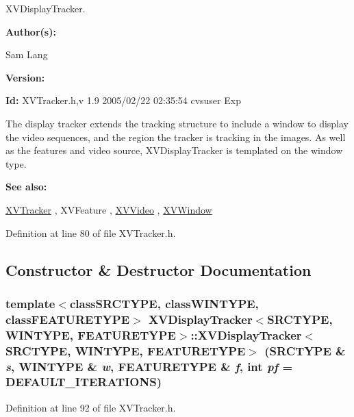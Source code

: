 XVDisplay\-Tracker.

\begin{Desc}
\item[{\bf Author(s): }]\par
 Sam Lang \end{Desc}
\begin{Desc}
\item[{\bf Version: }]\par
 \end{Desc}
\begin{Desc}
\item[{\bf Id: }] XVTracker.h,v 1.9 2005/02/22 02:35:54 cvsuser Exp \end{Desc}


The display tracker extends the tracking structure to include a window to display the video sequences, and the region the tracker is tracking in the images. As well as the features and video source, XVDisplay\-Tracker is templated on the window type.

\begin{Desc}
\item[{\bf See also: }]\par
 \hyperlink{class_XVTracker}{XVTracker} ,  XVFeature ,  \hyperlink{class_XVVideo}{XVVideo} ,  \hyperlink{class_XVWindow}{XVWindow} \end{Desc}




Definition at line 80 of file XVTracker.h.

\subsection{Constructor \& Destructor Documentation}
\label{XVDisplayTracker_a0}
\hypertarget{class_XVDisplayTracker_a0}{
\subsubsection[XVDisplayTracker]{\setlength{\rightskip}{0pt plus 5cm}template$<$classSRCTYPE, classWINTYPE, classFEATURETYPE$>$ XVDisplay\-Tracker$<$SRCTYPE, WINTYPE, FEATURETYPE$>$::XVDisplay\-Tracker$<$SRCTYPE, WINTYPE, FEATURETYPE$>$ (SRCTYPE \& {\em s}, WINTYPE \& {\em w}, FEATURETYPE \& {\em f}, int {\em pf} = DEFAULT\_\-ITERATIONS)}}




Definition at line 92 of file XVTracker.h.

